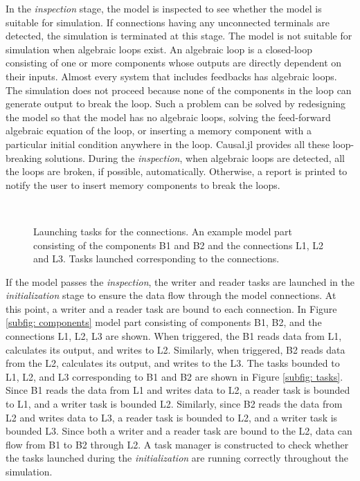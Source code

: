 \documentclass{juliacon}
\begin{document}
In the \textit{inspection} stage, the model is inspected to see whether the model is suitable for simulation. If connections having any unconnected terminals are detected, the simulation is terminated at this stage. The model is not suitable for simulation when algebraic loops exist\cite{lamego2001adaptive}. An algebraic loop is a closed-loop consisting of one or more components whose outputs are directly dependent on their inputs. Almost every system that includes feedbacks has algebraic loops. The simulation does not proceed because none of the components in the loop can generate output to break the loop. Such a problem can be solved by redesigning the model so that the model has no algebraic loops, solving the feed-forward algebraic equation of the loop, or inserting a memory component with a particular initial condition anywhere in the loop. Causal.jl provides all these loop-breaking solutions. During the \textit{inspection}, when algebraic loops are detected, all the loops are broken, if possible, automatically. Otherwise, a report is printed to notify the user to insert memory components to break the loops.

\begin{figure}
    \centering
     \\
    \caption{Launching tasks for the connections. \protect{} An example model part consisting of the components B1 and B2 and the connections L1, L2 and L3. \protect{} Tasks launched corresponding to the connections.}
    \label{fig: tasks for components}
\end{figure}

If the model passes the \textit{inspection}, the writer and reader tasks are launched in the \textit{initialization} stage to ensure the data flow through the model connections. At this point, a writer and a reader task are bound to each connection. In Figure \ref{subfig: components} model part consisting of components B1, B2, and the connections L1, L2, L3 are shown. When triggered, the B1 reads data from L1, calculates its output, and writes to L2. Similarly, when triggered, B2 reads data from the L2, calculates its output, and writes to the L3. The tasks bounded to L1, L2, and L3 corresponding to B1 and B2 are shown in Figure \ref{subfig: tasks}. Since B1 reads the data from L1 and writes data to L2, a reader task is bounded to L1, and a writer task is bounded L2. Similarly, since B2 reads the data from L2 and writes data to L3, a reader task is bounded to L2, and a writer task is bounded L3. Since both a writer and a reader task are bound to the L2, data can flow from B1 to B2 through L2. A task manager is constructed to check whether the tasks launched during the \textit{initialization} are running correctly throughout the simulation.
\end{document}
